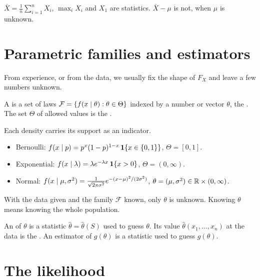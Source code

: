 \begin{example}
$\bar X=\frac1n\sum_{i=1}^n X_i$, $\max_i X_i$ and $X_1$ are statistics. $\bar X-\mu$ is not, when $\mu$ is unknown.
\end{example}

\section{Parametric families and estimators}

From experience, or from the data, we usually fix the shape of $F_X$ and leave a few numbers unknown.

\begin{definition}
A  is a set of laws $\mathcal F=\{f(x\mid\theta):\theta\in\Theta\}$ indexed by a number or vector $\theta$, the . The set $\Theta$ of allowed values is the .
\end{definition}

\begin{example}
Each density carries its support as an indicator.
\begin{itemize}
  \item Bernoulli: $f(x\mid p)=p^x(1-p)^{1-x}\,\mathbf{1}\{x\in\{0,1\}\}$, $\Theta=[0,1]$.
  \item Exponential: $f(x\mid\lambda)=\lambda e^{-\lambda x}\,\mathbf{1}\{x>0\}$, $\Theta=(0,\infty)$.
  \item Normal: $f(x\mid\mu,\sigma^2)=\frac{1}{\sqrt{2\pi\sigma^2}}e^{-(x-\mu)^2/(2\sigma^2)}$, $\theta=(\mu,\sigma^2)\in\mathbb{R}\times(0,\infty)$.
\end{itemize}
\end{example}

With the data given and the family $\mathcal F$ known, only $\theta$ is unknown. Knowing $\theta$ means knowing the whole population.

\begin{definition}
An  of $\theta$ is a statistic $\hat\theta=\hat\theta(S)$ used to guess $\theta$. Its value $\hat\theta(x_1,\dots,x_n)$ at the data is the . An estimator of $g(\theta)$ is a statistic used to guess $g(\theta)$.
\end{definition}

\section{The likelihood}

